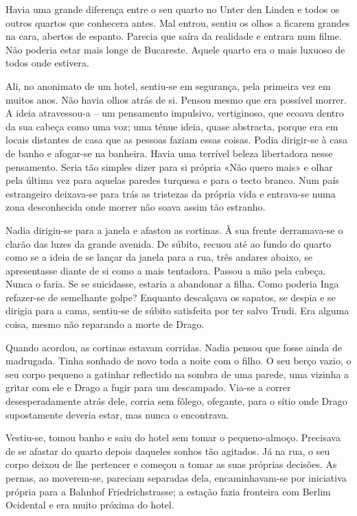 Havia uma grande diferença entre o seu quarto no Unter den Linden e
todos os outros quartos que conhecera antes. Mal entrou, sentiu os olhos
a ficarem grandes na cara, abertos de espanto. Parecia que saíra da
realidade e entrara num filme. Não poderia estar mais longe de Bucareste. Aquele quarto era o mais luxuoso de todos onde estivera.

Ali, no anonimato de um hotel, sentiu-se em segurança, pela primeira vez
em muitos anos. Não havia olhos atrás de si. Pensou mesmo que era
possível morrer. A ideia atravessou-a -- um pensamento impulsivo,
vertiginoso, que ecoava dentro da sua cabeça como uma voz; uma ténue
ideia, quase abstracta, porque era em locais distantes de casa que as
pessoas faziam essas coisas. Podia dirigir-se à casa de banho e
afogar-se na banheira. Havia uma terrível beleza libertadora nesse
pensamento. Seria tão simples dizer para si própria «Não quero mais» e
olhar pela última vez para aquelas paredes turquesa e para o tecto
branco. Num país estrangeiro deixava-se para trás as tristezas da
própria vida e entrava-se numa zona desconhecida onde morrer não soava
assim tão estranho.

Nadia dirigiu-se para a janela e afastou as cortinas. À sua frente
derramava-se o clarão das luzes da grande avenida. De súbito, recuou até
ao fundo do quarto como se a ideia de se lançar da janela para a rua,
três andares abaixo, se apresentasse diante de si como a mais tentadora.
Passou a mão pela cabeça. Nunca o faria. Se se suicidasse, estaria a
abandonar a filha. Como poderia Inga refazer-se de semelhante golpe?
Enquanto descalçava os sapatos, se despia e se dirigia para a cama,
sentiu-se de súbito satisfeita por ter salvo Trudi. Era alguma coisa,
mesmo não reparando a morte de Drago.

Quando acordou, as cortinas estavam corridas. Nadia pensou que fosse
ainda de madrugada. Tinha sonhado de novo toda a noite com o filho. O
seu berço vazio, o seu corpo pequeno a gatinhar reflectido na sombra de
uma parede, uma vizinha a gritar com ele e Drago a fugir para um
descampado. Via-se a correr desesperadamente atrás dele, corria sem
fôlego, ofegante, para o sítio onde Drago supostamente deveria estar,
mas nunca o encontrava.

Vestiu-se, tomou banho e saiu do hotel sem tomar o pequeno-almoço.
Precisava de se afastar do quarto depois daqueles sonhos tão agitados.
Já na rua, o seu corpo deixou de lhe pertencer e começou a tomar as
suas próprias decisões. As pernas, ao moverem-se, pareciam separadas
dela, encaminhavam-se por iniciativa própria para a Bahnhof
Friedrichstrasse; a estação fazia fronteira com Berlim Ocidental e era
muito próxima do hotel.

